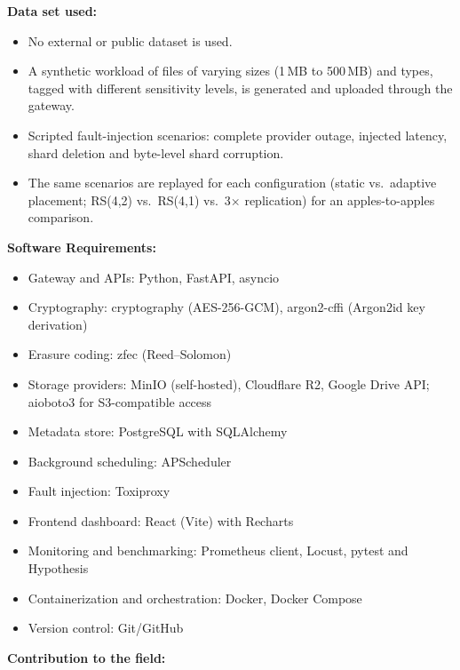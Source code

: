 \documentclass[11pt,a4paper]{article}
\newcommand{\sectionhead}[1]{\vspace{10pt}\textbf{#1}\par}
\begin{document}
\sectionhead{Data set used:}

\begin{itemize}[leftmargin=*,label=\textbullet,itemsep=4pt]
  \item No external or public dataset is used.
  \item A synthetic workload of files of varying sizes (1\,MB to 500\,MB) and types, tagged with
        different sensitivity levels, is generated and uploaded through the gateway.
  \item Scripted fault-injection scenarios: complete provider outage, injected latency, shard deletion
        and byte-level shard corruption.
  \item The same scenarios are replayed for each configuration (static vs.\ adaptive placement;
        RS(4,2) vs.\ RS(4,1) vs.\ 3$\times$ replication) for an apples-to-apples comparison.
\end{itemize}

\sectionhead{Software Requirements:}

\begin{itemize}[leftmargin=*,label=\textbullet,itemsep=4pt]
  \item Gateway and APIs: Python, FastAPI, asyncio
  \item Cryptography: cryptography (AES-256-GCM), argon2-cffi (Argon2id key derivation)
  \item Erasure coding: zfec (Reed--Solomon)
  \item Storage providers: MinIO (self-hosted), Cloudflare R2, Google Drive API; aioboto3 for S3-compatible access
  \item Metadata store: PostgreSQL with SQLAlchemy
  \item Background scheduling: APScheduler
  \item Fault injection: Toxiproxy
  \item Frontend dashboard: React (Vite) with Recharts
  \item Monitoring and benchmarking: Prometheus client, Locust, pytest and Hypothesis
  \item Containerization and orchestration: Docker, Docker Compose
  \item Version control: Git/GitHub
\end{itemize}

\sectionhead{Contribution to the field:}
\end{document}
